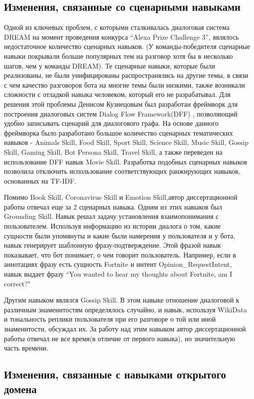 \subsection{Изменения, связанные со сценарными навыками}
Одной из ключевых проблем, с которыми сталкивалась диалоговая система DREAM на момент проведения конкурса “Alexa Prize Challenge 3”, являлось недостаточное количество сценарных навыков. (У команды-победителя сценарные навыки покрывали больше популярных тем на разговор хотя бы в несколько шагов, чем у команды DREAM). Те сценарные навыки, которые были реализованы, не были унифицированы распространялись на другие темы, в связи с чем качество разговоров бота на многие темы были низкими, также возникали сложности с отладкой навыка человеком, который его не разрабатывал. Для решения этой проблемы Денисом Кузнецовым был разработан фреймворк для построения диалоговых систем Dialog Flow Framework(DFF) \cite{dff}, позволяющий удобно записывать сценарий для диалогового графа. На основе данного фреймворка было разработано большое количество сценарных тематических навыков - Animals Skill, Food Skill, Sport Skill, Science Skill, Music Skill, Gossip Skill, Gaming Skill, Bot Persona Skill, Travel Skill, а также переведен на использование DFF навык Movie Skill. Разработка подобных сценарных навыков позволила отключить использование соответствующих ранжирующих навыков, основанных на TF-IDF.

Помимо Book Skill, Coronavirus Skill и Emotion Skill,автор диссертационной работы отвечал еще за 2 сценарных навыка.
Одним из этих навыков был Grounding Skill. Навык решал задачу установления взаимопонимания с пользователем. Используя информацию из истории диалога о том, какие сущности были упомянуты и какие были намерения у пользователя и у бота, навык генерирует шаблонную фразу-подтверждение. Этой фразой навык показывает, что бот понимает, о чем говорит пользователь. Например, если в аннотациях фразу есть сущность Fortnite и интент Opinion\_RequestIntent, навык выдает фразу “You wanted to hear my thoughts about Fortnite, am I correct?"

Другим навыком являлся Gossip Skill. В этом навыке отношение диалоговой к различным знаменитостям определялось случайно, и навык, используя WikiData и тональность реплики пользователя при его разговоре о той или иной знаменитости, обсуждал их. За работу над этим навыком автор диссертационной работы отвечал не все время(в отличие от первого навыка), но значительную часть времени.

\subsection{Изменения, связанные с навыками открытого домена}

